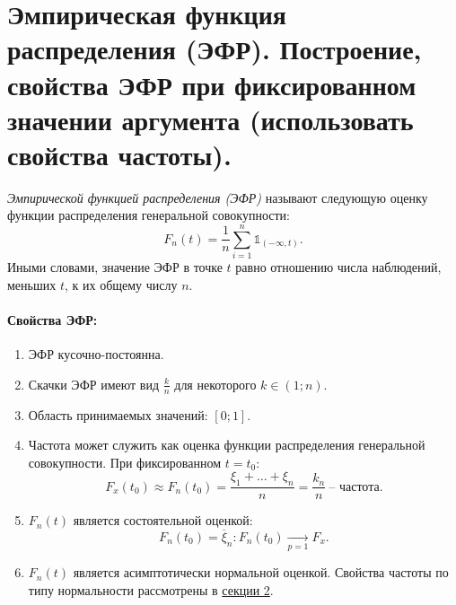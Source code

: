 \section{Эмпирическая функция распределения (ЭФР). Построение, свойства ЭФР при
фиксированном значении аргумента (использовать свойства частоты).}

\begin{definition}
    \textit{Эмпирической функцией распределения (ЭФР)} называют следующую оценку
    функции распределения генеральной совокупности:
    \[
        F_n(t) = \frac{1}{n} \sum_{i = 1}^{n} \mathbb{1}_{(-\infty, t)}
    .\]
    Иными словами, значение ЭФР в точке $t$ равно отношению числа наблюдений,
    меньших $t$, к их общему числу $n$.
\end{definition}

\paragraph{Свойства ЭФР:}

\begin{enumerate}
    \item ЭФР кусочно-постоянна.
    \item Скачки ЭФР имеют вид $\frac{k}{n}$ для некоторого $k \in (1; n)$.
    \item Область принимаемых значений: $[0; 1]$.
    \item Частота может служить как оценка функции распределения генеральной
        совокупности. При фиксированном $t = t_0$:
        \[
            F_x(t_0) \approx F_n(t_0) = \frac{\xi_1 + \ldots + \xi_n}{n} =
            \frac{k_n}{n}~ \text{-- частота}
        .\]
    \item $F_n(t)$ является состоятельной оценкой:
        \[
            F_n(t_0) = \overline{\xi}_n: F_n(t_0) \xrightarrow[p = 1]{} F_x
        .\]
    \item $F_n(t)$ является асимптотически нормальной оценкой. Свойства частоты
    по типу нормальности рассмотрены в \hyperref[sec:normfreq]{секции 2}.
\end{enumerate}
